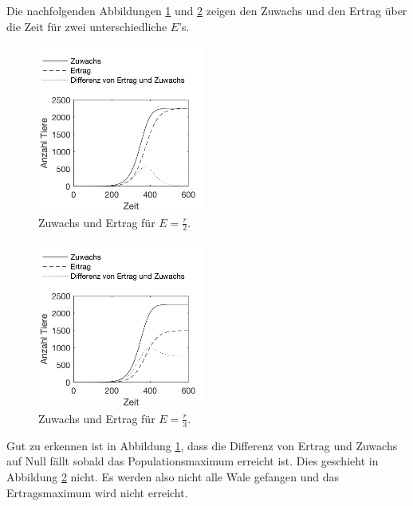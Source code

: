 \documentclass[a4paper,twoside]{article}
\begin{document}
	\newpage	
	
	Die nachfolgenden Abbildungen \ref{fig:zuwachs_etrag_auf_zeit1} und \ref{fig:zuwachs_etrag_auf_zeit2} zeigen den Zuwachs und den Ertrag über die Zeit für zwei unterschiedliche \(E\)'s.
	\begin{figure}[!h]
  		\centering
 		\includegraphics[width=5.5cm]{Diagramme/zuwachs_etrag_auf_zeit1.png}
  		\caption{Zuwachs und Ertrag für \(E = \frac{r}{2}\).}
  		\label{fig:zuwachs_etrag_auf_zeit1}
	\end{figure}
	\begin{figure}[!h]
  		\centering
 		\includegraphics[width=5.5cm]{Diagramme/zuwachs_etrag_auf_zeit2.png}
  		\caption{Zuwachs und Ertrag für \(E = \frac{r}{3}\).}
  		\label{fig:zuwachs_etrag_auf_zeit2}
	\end{figure}

	Gut zu erkennen ist in Abbildung \ref{fig:zuwachs_etrag_auf_zeit1}, dass die Differenz von Ertrag und Zuwachs auf Null fällt sobald das Populationsmaximum erreicht ist. Dies geschieht in Abbildung \ref{fig:zuwachs_etrag_auf_zeit2} nicht. Es werden also nicht alle Wale gefangen und das Ertragsmaximum wird nicht erreicht.
\end{document}
